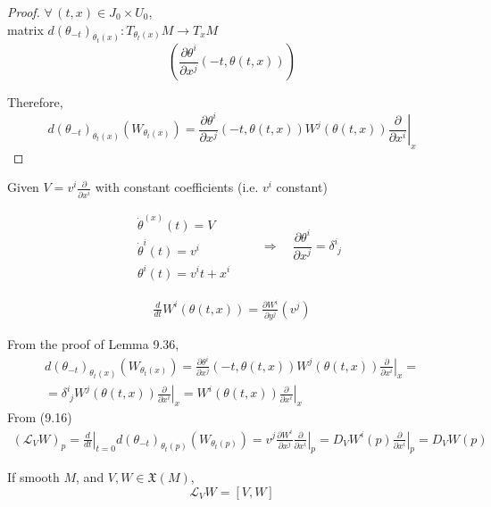 \begin{proof}
  $\forall \, (t,x ) \in J_0 \times U_0$, \\
  matrix $d(\theta_{-t})_{\theta_t(x)}: T_{\theta_t(x)}M \to T_xM$
\[
\left( \frac{ \partial \theta^i}{ \partial x^j}(-t, \theta(t,x)) \right)
\]

Therefore,
\[
d(\theta_{-t})_{\theta_t(x)}(W_{\theta_t(x)}) = \frac{ \partial \theta^i}{ \partial x^j}(-t,\theta(t,x)) W^j(\theta(t,x)) \left. \frac{ \partial }{ \partial x^i} \right|_x
\]

\end{proof}


Given $V = v^i \frac{ \partial }{ \partial x^i}$ with constant coefficients (i.e. $v^i$ constant)

\[
\begin{aligned}
  & \dot{\theta}^{(x)}(t) = V \\ 
  & \dot{\theta}^i(t) = v^i  \\
  & \theta^i(t)= v^it + x^i
\end{aligned} \quad \quad \Longrightarrow \quad 
\frac{ \partial \theta^i}{ \partial x^j} = \delta^i_{ \, \, j}
\]

\[
\begin{gathered}
\frac{d}{dt} W^i(\theta(t,x))  = \frac{ \partial W^i}{ \partial y^j}(v^j) 
\end{gathered}
\]

From the proof of Lemma 9.36, 
\[
\begin{gathered}
  d(\theta_{-t})_{\theta_t(x)}(W_{\theta_t(x)}) = \frac{ \partial \theta^i}{ \partial x^j}(-t,\theta(t,x)) W^j(\theta(t,x)) \left. \frac{ \partial }{ \partial x^i} \right|_x = \\
 = \delta^i_{ \, \, j} W^j(\theta(t,x)) \left. \frac{ \partial }{ \partial x^i} \right|_x  = W^i(\theta(t,x)) \left. \frac{ \partial }{ \partial x^i} \right|_x
\end{gathered}
\]
From (9.16)
\[
\begin{gathered}
  (\mathcal{L}_VW)_p = \left. \frac{d}{dt} \right|_{t=0} d(\theta_{-t})_{\theta_t(p)}(W_{ \theta_t(p) } ) = v^j \frac{ \partial W^i}{ \partial x^j} \left. \frac{ \partial }{ \partial x^i} \right|_p = D_VW^i(p) \left. \frac{ \partial }{ \partial x^i} \right|_p = D_VW(p)
\end{gathered}
\]

\hrulefill

\begin{theorem}[9.38] If smooth $M$, and $V,W \in \mathfrak{X}(M)$, 
\[
\mathcal{L}_VW = [V,W]
\]
\end{theorem}



